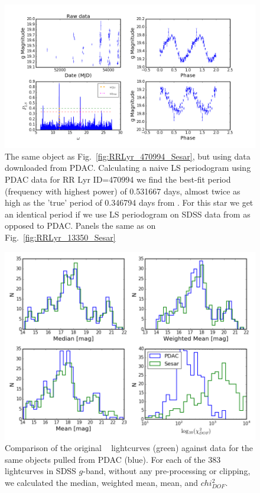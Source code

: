 \documentclass[fleqn,usenatbib]{mnras} %
\begin{document}
\begin{figure}
\includegraphics[width=\textwidth]{figs/Fig_2_RRLyr_LS_periodogram_ID_470994_gPDAC}
\caption{ The same object as Fig.~\ref{fig:RRLyr_470994_Sesar}, but using data downloaded from PDAC. Calculating a naive LS periodogram using PDAC data for RR Lyr ID=470994 we find the  best-fit period (frequency with highest power) of 0.531667  days, almost twice as high as the 'true'  period of 0.346794 days from  \citep{sesar2010}. For this star we get an identical period if we use LS periodogram on SDSS data from \citep{sesar2010} as opposed to PDAC. Panels the same as on Fig.~\ref{fig:RRLyr_13350_Sesar}}
\label{fig:RRLyr_470994_PDAC}
\end{figure}


\begin{figure}
\includegraphics[width=\columnwidth]{figs/Fig_PDAC_sesar_compare}
\caption{Comparison of the original ~\citep{sesar2010}  lightcurves (green) against data for the same objects  pulled from PDAC (blue). For each of the 383 lightcurves in SDSS $g$-band, without any pre-processing or clipping, we calculated the median, weighted mean, mean, and $chi^{2}_{DOF}$. }
\label{fig:PDAC_SDSS_comp}
\end{figure}
\end{document}
